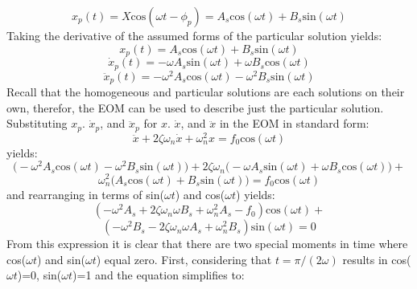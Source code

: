 \documentclass[12pt,letter]{article}
\numberwithin{ex}{section} %
\numberwithin{re}{section} %
\numberwithin{pr}{section} %
\begin{document}
			\begin{equation}
				x_p(t) = X \text{cos}(\omega t - \phi_p) = A_s \text{cos}(\omega t) + B_s  \text{sin}(\omega t)
			\end{equation}			 
			Taking the derivative of the assumed forms of the particular solution yields:
			\begin{equation}
				x_p(t) = A_s \text{cos}(\omega t) + B_s  \text{sin}(\omega t)
			\end{equation}	
			\begin{equation}
				\dot{x}_p(t) = -\omega A_s \text{sin}(\omega t) + \omega B_s  \text{cos}(\omega t)
			\end{equation}				 
			\begin{equation}
				\ddot{x}_p(t) = -\omega^2 A_s \text{cos}(\omega t) - \omega^2 B_s  \text{sin}(\omega t)
			\end{equation}				
			Recall that the homogeneous and particular solutions are each solutions on their own, therefor, the EOM can be used to describe just the particular solution. Substituting $x_p$. $\dot{x}_p$, and $\ddot{x}_p$ for $x$. $\dot{x}$, and $\ddot{x}$ in the EOM in standard form:
			\begin{equation}
			 	\ddot{x}+2 \zeta \omega_n \dot{x} +\omega_n^2x = f_0\text{cos}(\omega t)
			\end{equation}
			yields:
			\begin{equation}
			 	\big(	-\omega^2 A_s \text{cos}(\omega t) - \omega^2 B_s  \text{sin}(\omega t) \big)+2 \zeta \omega_n  \big( -\omega A_s \text{sin}(\omega t) + \omega B_s  \text{cos}(\omega t)  \big) +
			\end{equation}
			\begin{equation*}
				\omega_n^2 \big( A_s \text{cos}(\omega t) + B_s  \text{sin}(\omega t) \big) = f_0\text{cos}(\omega t)
			\end{equation*}				
			and rearranging in terms of sin($\omega t$) and cos($\omega t$) yields: 
			\begin{equation}
				(-\omega^2 A_s + 2 \zeta \omega_n \omega B_s + \omega_n^2 A_s -f_0) \text{cos}(\omega t) + 
			\end{equation}
			\begin{equation*}
				(-\omega^2 B_s - 2 \zeta \omega_n \omega A_s + \omega_n^2 B_s)\text{sin}(\omega t) =0
			\end{equation*}	
			From this expression it is clear that there are two special moments in time where cos($\omega t$) and sin($\omega t$) equal zero. First, considering that $t=\pi/(2\omega)$ results in cos($\omega t$)=0, sin($\omega t$)=1 and the equation simplifies to:
\end{document}
